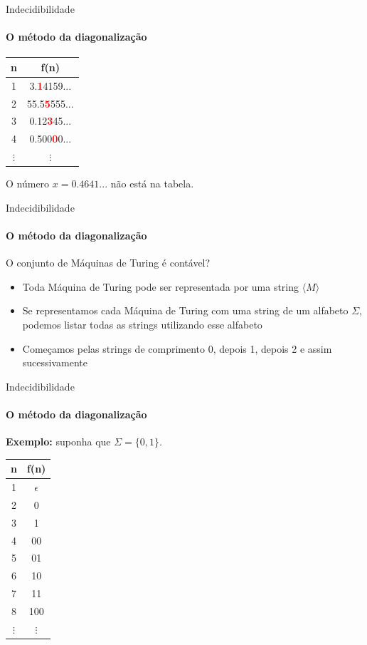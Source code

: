 \documentclass{beamer}
\begin{document}
\begin{frame}{Indecidibilidade}
	\framesubtitle{O método da diagonalização}
	\begin{table}[!b]
	{\carlitoTLF
		\begin{tabular}{cc}
				\textbf{n} & \textbf{f(n)} \\
				\toprule
				1 & 3.\textcolor{red}{\textbf{1}}4159... \\
				2 & 55.5\textcolor{red}{\textbf{5}}555... \\
				3 & 0.12\textcolor{red}{\textbf{3}}45... \\
				4 & 0.500\textcolor{red}{\textbf{0}}0... \\
				$\vdots$ & $\vdots$ \\
				\bottomrule
		\end{tabular}}
	\end{table}
	O número $x = 0.4641...$ não está na tabela.
\end{frame}
\begin{frame}{Indecidibilidade}
	\framesubtitle{O método da diagonalização}
	O conjunto de Máquinas de Turing é contável?\pause
	\begin{itemize}
		\item Toda Máquina de Turing pode ser representada por uma string $\langle M\rangle$
		\item Se representamos cada Máquina de Turing com uma string de um alfabeto $\Sigma$, podemos listar todas as strings utilizando esse alfabeto
		\item Começamos pelas strings de comprimento 0, depois 1, depois 2 e assim sucessivamente
	\end{itemize}
\end{frame}
\begin{frame}{Indecidibilidade}
	\framesubtitle{O método da diagonalização}
	\textbf{Exemplo:} suponha que $\Sigma=\{0,1\}$.
	\begin{table}[!b]
	{\carlitoTLF
		\begin{tabular}{cc}
			\textbf{n} & \textbf{f(n)} \\
			\toprule
			1 & $\epsilon$ \\
			2 & 0 \\
			3 & 1 \\
			4 & 00 \\
			5 & 01 \\
			6 & 10 \\
			7 & 11 \\
			8 & 100 \\
			$\vdots$ & $\vdots$ \\
			\bottomrule
		\end{tabular}}
	\end{table}
\end{frame}
\end{document}
